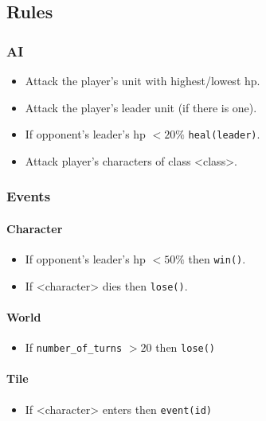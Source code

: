 \subsection{Rules}
\subsubsection{AI}
\begin{itemize}
	\item Attack the player's unit with  highest/lowest hp.
	\item Attack the player's leader unit (if there is one).
	\item If opponent's leader's hp $< 20\%$ \texttt{heal(leader)}.
	\item Attack player's characters of class <class>.
\end{itemize}

\subsubsection{Events}
\paragraph{Character}
\begin{itemize}
	\item If opponent's leader's hp $< 50\%$ then \texttt{win()}.
	\item If <character> dies then \texttt{lose()}.
\end{itemize}

\paragraph{World}
\begin{itemize}
	\item If \texttt{number\_of\_turns} $> 20$ then \texttt{lose()} 
\end{itemize}

\paragraph{Tile}
\begin{itemize}
	\item If <character> enters then \texttt{event(id)} 
\end{itemize}

